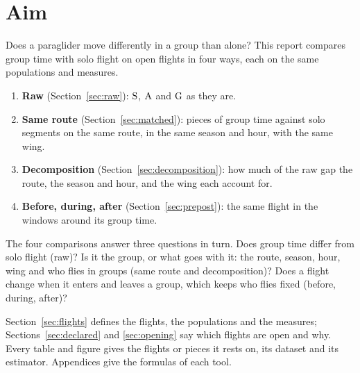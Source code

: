 \section{Aim}\label{sec:aim}

Does a paraglider move differently in a group than alone? This report compares group time with solo flight on
open flights in four ways, each on the same populations and measures.

\begin{enumerate}
  \item \textbf{Raw} (Section~\ref{sec:raw}): $\mathrm{S}$, $\mathrm{A}$ and $\mathrm{G}$ as they are.
  \item \textbf{Same route} (Section~\ref{sec:matched}): pieces of group time against solo segments on the same route, in the same season and hour, with the same wing.
  \item \textbf{Decomposition} (Section~\ref{sec:decomposition}): how much of the raw gap the route, the season and hour, and the wing each account for.
  \item \textbf{Before, during, after} (Section~\ref{sec:prepost}): the same flight in the windows around its group time.
\end{enumerate}

The four comparisons answer three questions in turn. Does group time differ from solo flight (raw)? Is it the group, or what goes with it: the route, season, hour, wing and who flies in groups (same route and decomposition)? Does a flight change when it enters and leaves a group, which keeps who flies fixed (before, during, after)?

Section~\ref{sec:flights} defines the flights, the populations and the measures; Sections~\ref{sec:declared} and
\ref{sec:opening} say which flights are open and why. Every table and figure gives the flights or pieces it rests on,
its dataset and its estimator. Appendices give the formulas of each tool.
